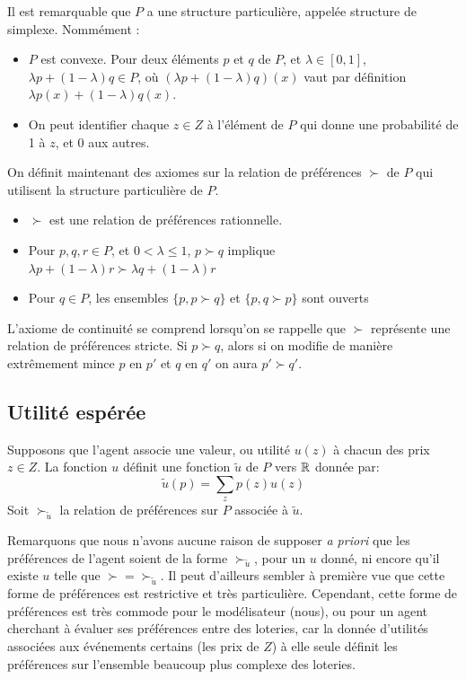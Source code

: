  Il est remarquable que $P$ a une structure particulière, appelée
structure de simplexe. Nommément :
\begin{itemize}
\item $P$ est convexe. Pour deux éléments $p$ et $q$ de $P$, et
$\lambda\in[0,1]$, $\lambda p + (1-\lambda) q \in P$, o\`u
$(\lambda p + (1-\lambda) q)(x)$ vaut par définition $\lambda p(x)
+ (1-\lambda) q(x)$. %
\item On peut identifier chaque $z\in Z$ à l'élément de $P$ qui
donne une probabilité de 1 à $z$, et $0$ aux autres.
\end{itemize}

 On définit maintenant des axiomes sur la relation de préférences
$\succ$ de $P$ qui utilisent la structure particulière de $P$.

\begin{itemize}
\item[{\bf Rationalité}] $\succ$ est une relation de
préférences rationnelle.%
\item[\bf Indépendance] Pour $p,q,r\in P$, et $0<\lambda\leq 1$,
$p\succ q$ implique $\lambda p+(1-\lambda)r\succ \lambda
q+(1-\lambda)r$%
\item[\bf Continuité] Pour $q\in P$, les ensembles $\{p, p\succ
q\}$ et $\{p, q\succ p\}$ sont ouverts
\end{itemize}

L'axiome de continuité se comprend lorsqu'on se rappelle que
$\succ$ représente une relation de préférences stricte. Si $p\succ
q$, alors si on modifie de manière extr\^emement mince $p$ en $p'$
et $q$ en $q'$ on aura $p'\succ q'$.

\subsection{Utilité espérée}
Supposons que l'agent associe une valeur, ou utilité $u(z)$ à
chacun des prix $z\in Z$. La fonction $u$ définit une fonction
$\tilde u$ de $P$ vers $\mathbb R$ donnée par:
$$
\tilde u(p) = \sum_z p(z) u(z)
$$
Soit $\succ_{\tilde u}$ la relation de préférences sur $P$
associée à $\tilde u$.

Remarquons que nous n'avons aucune raison de supposer {\em a
priori} que les préférences de l'agent soient de la forme
$\succ_{\tilde u}$, pour un $u$ donné, ni encore qu'il existe $u$
telle que $\succ = \succ_{\tilde u}$. Il peut d'ailleurs sembler à
première vue que cette forme de préférences est restrictive et
très particulière. Cependant, cette forme de préférences est très
commode pour le modélisateur (nous), ou pour un agent cherchant à
évaluer ses préférences entre des loteries, car la donnée
d'utilités associées aux événements certains (les prix de $Z$) à
elle seule définit les préférences sur l'ensemble beaucoup plus
complexe des loteries.

